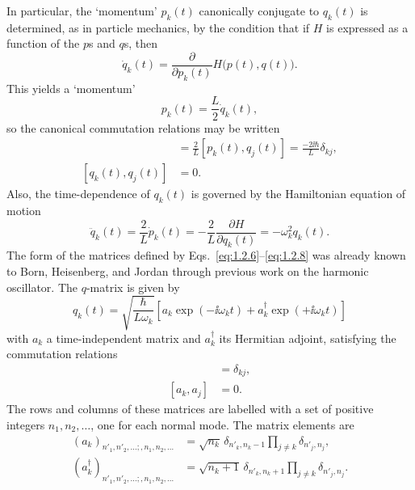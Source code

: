 In particular, the `momentum' $p_k(t)$ canonically conjugate to $q_k(t)$ is
determined, as in particle mechanics, by the condition that if $H$ is expressed
as a function of the $p$s and $q$s, then
\[
  \dot q_k(t)=\frac{\partial}{\partial p_k(t)}H\bigl(p(t),q(t)\bigr).
\]
This yields a `momentum'
\begin{equation}
  p_k(t)=\frac{L}{2}\dot q_k(t),
  \tag{1.2.5}\label{eq:1.2.5}
\end{equation}
so the canonical commutation relations may be written
\begin{align}
  [\dot q_k(t),q_j(t)]
    &=\frac{2}{L}[p_k(t),q_j(t)]
    =\frac{-2\ii\hbar}{L}\delta_{kj},
  \tag{1.2.6}\label{eq:1.2.6}\\
  [q_k(t),q_j(t)]&=0.
  \tag{1.2.7}\label{eq:1.2.7}
\end{align}
Also, the time-dependence of $q_k(t)$ is governed by the Hamiltonian equation
of motion
\begin{equation}
  \ddot q_k(t)=\frac{2}{L}\dot p_k(t)
  =-\frac{2}{L}\frac{\partial H}{\partial q_k(t)}
  =-\omega_k^2q_k(t).
  \tag{1.2.8}\label{eq:1.2.8}
\end{equation}
The form of the matrices defined by Eqs.~\eqref{eq:1.2.6}--\eqref{eq:1.2.8} was already
known to Born, Heisenberg, and Jordan through previous work on the
harmonic oscillator. The $q$-matrix is given by
\begin{equation}
  q_k(t)=\sqrt{\frac{\hbar}{L\omega_k}}
  \left[a_k\exp(-\ii\omega_kt)+a_k^{\dagger}\exp(+\ii\omega_kt)\right]
  \tag{1.2.9}\label{eq:1.2.9}
\end{equation}
with $a_k$ a time-independent matrix and $a_k^{\dagger}$ its Hermitian adjoint,
satisfying the commutation relations
\begin{align}
  [a_k,a_j^{\dagger}]&=\delta_{kj},
  \tag{1.2.10}\label{eq:1.2.10}\\
  [a_k,a_j]&=0.
  \tag{1.2.11}\label{eq:1.2.11}
\end{align}
The rows and columns of these matrices are labelled with a set of positive
integers $n_1,n_2,\ldots$, one for each normal mode. The matrix elements are
\begin{align}
  (a_k)_{n'_1,n'_2,\ldots;,n_1,n_2,\ldots}
    &=\sqrt{n_k}\,\delta_{n'_k,n_k-1}
      \prod_{j\ne k}\delta_{n'_j,n_j},
  \tag{1.2.12}\label{eq:1.2.12}\\
  (a_k^{\dagger})_{n'_1,n'_2,\ldots;,n_1,n_2,\ldots}
    &=\sqrt{n_k+1}\,\delta_{n'_k,n_k+1}
      \prod_{j\ne k}\delta_{n'_j,n_j}.
  \tag{1.2.13}\label{eq:1.2.13}
\end{align}
